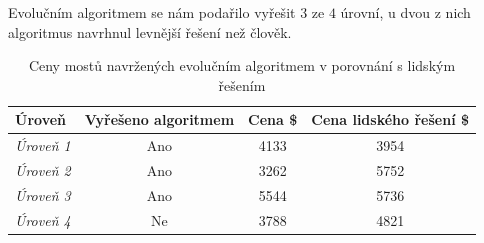 Evolučním algoritmem se nám podařilo vyřešit $3$ ze $4$ úrovní, u dvou z nich algoritmus navrhnul levnější řešení než člověk.

\begin{table}[b!]
\centering
\begin{tabular}{lccc}
\toprule
\textbf{Úroveň} & \textbf{Vyřešeno algoritmem} & \textbf{Cena \$} & \textbf{Cena lidského řešení \$} \\
\midrule
\emph{Úroveň 1} & Ano &  4133 & 3954 \\
\emph{Úroveň 2} & Ano &  3262 & 5752 \\
\emph{Úroveň 3} & Ano &  5544 & 5736 \\
\emph{Úroveň 4} & Ne  &  3788 & 4821 \\
\bottomrule
\end{tabular}
\caption{Ceny mostů navržených evolučním algoritmem v porovnání s lidským řešením}
\label{tab:2}
\end{table}


